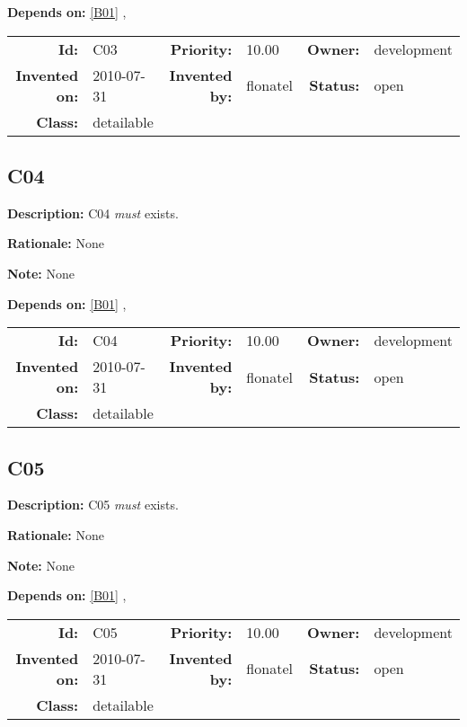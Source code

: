\textbf{Depends on:} \ref{B01} , 

\par
{\small \begin{center}\begin{tabular}{rlrlrl}
\textbf{Id:} & C03 & \textbf{Priority:} & 10.00 & \textbf{Owner:} & development \\ 
\textbf{Invented on:} & 2010-07-31 & \textbf{Invented by:} & flonatel & \textbf{Status:} & open \\ 
\textbf{Class:} & detailable & & & & \\ 
\end{tabular}\end{center} }%
\subsection{C04}\label{C04}
\textbf{Description:} C04 \textsl{must} exists.

\textbf{Rationale:} None

\textbf{Note:} None

\textbf{Depends on:} \ref{B01} , 

\par
{\small \begin{center}\begin{tabular}{rlrlrl}
\textbf{Id:} & C04 & \textbf{Priority:} & 10.00 & \textbf{Owner:} & development \\ 
\textbf{Invented on:} & 2010-07-31 & \textbf{Invented by:} & flonatel & \textbf{Status:} & open \\ 
\textbf{Class:} & detailable & & & & \\ 
\end{tabular}\end{center} }%
\subsection{C05}\label{C05}
\textbf{Description:} C05 \textsl{must} exists.

\textbf{Rationale:} None

\textbf{Note:} None

\textbf{Depends on:} \ref{B01} , 

\par
{\small \begin{center}\begin{tabular}{rlrlrl}
\textbf{Id:} & C05 & \textbf{Priority:} & 10.00 & \textbf{Owner:} & development \\ 
\textbf{Invented on:} & 2010-07-31 & \textbf{Invented by:} & flonatel & \textbf{Status:} & open \\ 
\textbf{Class:} & detailable & & & & \\ 
\end{tabular}\end{center} }%
